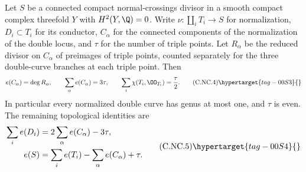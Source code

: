 
\begin{proposition}\hypertarget{tag-01C9}{}\label{cdp:st:C.2.NC.2}


Let $S$ be a connected compact normal-crossings divisor in a smooth compact complex threefold $Y$ with $H^2(Y,\Q)=0$. Write $\nu:\coprod_iT_i\to S$ for normalization, $D_i\subset T_i$ for its conductor, $C_\alpha$ for the connected components of the normalization of the double locus, and $\tau$ for the number of triple points. Let $R_\alpha$ be the reduced divisor on $C_\alpha$ of preimages of triple points, counted separately for the three double-curve branches at each triple point. Then
\[
 e(C_\alpha)=\deg R_\alpha,\qquad
 \sum_\alpha e(C_\alpha)=3\tau,
 \qquad
 \sum_i\chi(T_i,\OO_{T_i})=\frac{\tau}{2}.
 \tag{C.NC.4}\hypertarget{tag-00S3}{}\label{cdp:eq:C.NC.4}
\]
In particular every normalized double curve has genus at most one, and $\tau$ is even. The remaining topological identities are
\[
\begin{aligned}
 \sum_i e(D_i)&=2\sum_\alpha e(C_\alpha)-3\tau,\\
 e(S)&=\sum_i e(T_i)-\sum_\alpha e(C_\alpha)+\tau.
\end{aligned}
 \tag{C.NC.5}\hypertarget{tag-00S4}{}\label{cdp:eq:C.NC.5}
\]
\end{proposition}

